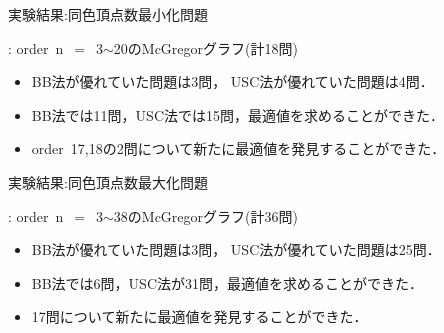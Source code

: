 \documentclass[dvipdfmx,11pt]{beamer}
\begin{document}
\begin{frame}{実験結果:同色頂点数最小化問題}

 \begin{block}{}
  : order\ n~$=$~3$\sim$20のMcGregorグラフ(計18問)
 \end{block}

 \begin{center}
  
 \end{center}

 \begin{itemize}
  \item BB法が優れていた問題は3問，
        USC法が優れていた問題は4問．
  \item BB法では11問，USC法では15問，最適値を求めることができた．
  \item order~17,18の2問について新たに最適値を発見することができた．
 \end{itemize}
 
\end{frame}


\begin{frame}{実験結果:同色頂点数最大化問題}

 \begin{block}{}
  : order\ n~$=$~3$\sim$38のMcGregorグラフ(計36問)
 \end{block}
 
 \begin{center}
  
 \end{center}

 \begin{itemize}
  \item BB法が優れていた問題は3問，
        USC法が優れていた問題は25問．
  \item BB法では6問，USC法が31問，最適値を求めることができた．
  \item 17問について新たに最適値を発見することができた．
 \end{itemize}

\end{frame}

\end{document}
